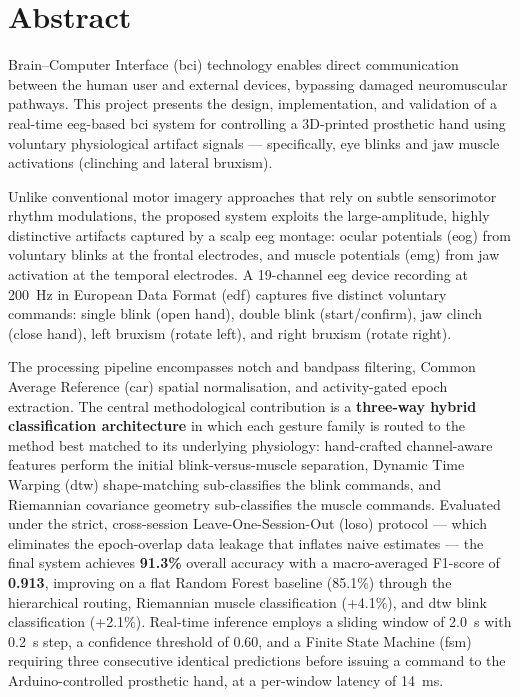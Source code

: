 \documentclass[12pt, a4paper, twoside]{report}
\begin{document}
\newpage

\chapter*{Abstract}

Brain--Computer Interface (\acrshort{bci}) technology enables direct
communication between the human user and external devices, bypassing
damaged neuromuscular pathways. This project presents the design,
implementation, and validation of a real-time \acrshort{eeg}-based
\acrshort{bci} system for controlling a 3D-printed prosthetic hand
using voluntary physiological artifact signals — specifically, eye
blinks and jaw muscle activations (clinching and lateral bruxism).

Unlike conventional motor imagery approaches that rely on subtle
sensorimotor rhythm modulations, the proposed system exploits the
large-amplitude, highly distinctive artifacts captured by a scalp
\acrshort{eeg} montage: ocular potentials (\acrshort{eog}) from
voluntary blinks at the frontal electrodes, and muscle potentials
(\acrshort{emg}) from jaw activation at the temporal electrodes. A
19-channel \acrshort{eeg} device recording at \SI{200}{\hertz} in
European Data Format (\acrshort{edf}) captures five distinct voluntary
commands: single blink (open hand), double blink (start/confirm), jaw
clinch (close hand), left bruxism (rotate left), and right bruxism
(rotate right).

The processing pipeline encompasses notch and bandpass filtering,
Common Average Reference (\acrshort{car}) spatial normalisation, and
activity-gated epoch extraction. The central methodological
contribution is a \textbf{three-way hybrid classification
architecture} in which each gesture family is routed to the method
best matched to its underlying physiology: hand-crafted channel-aware
features perform the initial blink-versus-muscle separation, Dynamic
Time Warping (\acrshort{dtw}) shape-matching sub-classifies the blink
commands, and Riemannian covariance geometry sub-classifies the muscle
commands. Evaluated under the strict, cross-session
Leave-One-Session-Out (\acrshort{loso}) protocol --- which eliminates
the epoch-overlap data leakage that inflates naive estimates --- the
final system achieves \textbf{91.3\%} overall accuracy with a
macro-averaged F1-score of \textbf{0.913}, improving on a flat
Random Forest baseline (85.1\%) through the hierarchical routing,
Riemannian muscle classification (+4.1\%), and \acrshort{dtw} blink
classification (+2.1\%). Real-time inference employs a sliding window
of \SI{2.0}{\second} with \SI{0.2}{\second} step, a confidence
threshold of 0.60, and a Finite State Machine (\acrshort{fsm})
requiring three consecutive identical predictions before issuing a
command to the Arduino-controlled prosthetic hand, at a per-window
latency of \SI{14}{\milli\second}.
\end{document}
